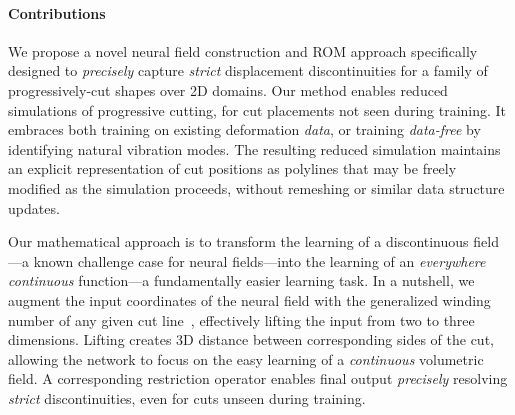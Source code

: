

\paragraph{Contributions}
We propose a novel neural field construction and ROM approach specifically designed to \emph{precisely} capture \emph{strict} displacement discontinuities for a family of progressively-cut shapes over 2D domains. Our method enables reduced simulations of progressive cutting, for cut placements not seen during training. It embraces both training on existing deformation \emph{data}, or training \emph{data-free} by identifying natural vibration modes. The resulting reduced simulation maintains an explicit representation of cut positions as polylines that may be freely modified as the simulation proceeds, without remeshing or similar data structure updates.

Our mathematical approach is to transform the learning of a discontinuous field---a known challenge case for neural fields---into the learning of an \emph{everywhere continuous} function---a fundamentally easier learning task. In a nutshell, we augment the input coordinates of the neural field with the generalized winding number of any given cut line~\cite{Jacobson:2018:GWN}, effectively lifting the input from two to three dimensions. Lifting creates 3D distance between corresponding sides of the cut, allowing the network to focus on the easy learning of a \emph{continuous} volumetric field. A corresponding restriction operator enables final output \emph{precisely} resolving \emph{strict} discontinuities, even for cuts unseen during training.

